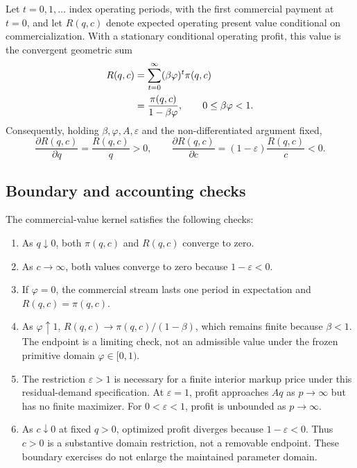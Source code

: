 Let \(t=0,1,\ldots\) index operating periods, with the first commercial
payment at \(t=0\), and let \(R(q,c)\) denote expected operating present
value conditional on commercialization. With a stationary conditional
operating profit, this value is the convergent geometric sum
\begin{align}
  R(q,c)
  &=\sum_{t=0}^{\infty}(\beta\varphi)^t\pi(q,c) \notag\\
  &=\frac{\pi(q,c)}{1-\beta\varphi},
  \qquad 0\leq\beta\varphi<1.
  \label{eq:p02-present-value}
\end{align}
Consequently, holding \(\beta,\varphi,A,\varepsilon\) and the
non-differentiated argument fixed,
\begin{equation}
  \frac{\partial R(q,c)}{\partial q}
  =\frac{R(q,c)}{q}>0,
  \qquad
  \frac{\partial R(q,c)}{\partial c}
  =(1-\varepsilon)\frac{R(q,c)}{c}<0.
  \label{eq:p02-return-derivatives}
\end{equation}

\subsection{Boundary and accounting checks}
\label{subsec:p02-boundary-accounting}

The commercial-value kernel satisfies the following checks:
\begin{enumerate}
  \item As \(q\downarrow0\), both \(\pi(q,c)\) and \(R(q,c)\) converge to
  zero.
  \item As \(c\to\infty\), both values converge to zero because
  \(1-\varepsilon<0\).
  \item If \(\varphi=0\), the commercial stream lasts one period in
  expectation and \(R(q,c)=\pi(q,c)\).
  \item As \(\varphi\uparrow1\),
  \(R(q,c)\to\pi(q,c)/(1-\beta)\), which remains finite because
  \(\beta<1\). The endpoint is a limiting check, not an admissible value
  under the frozen primitive domain \(\varphi\in[0,1)\).
  \item The restriction \(\varepsilon>1\) is necessary for a finite interior
  markup price under this residual-demand specification. At
  \(\varepsilon=1\), profit approaches \(Aq\) as \(p\to\infty\)
  but has no finite maximizer. For \(0<\varepsilon<1\), profit is
  unbounded as \(p\to\infty\).
  \item As \(c\downarrow0\) at fixed \(q>0\), optimized profit
  diverges because \(1-\varepsilon<0\). Thus \(c>0\) is a substantive
  domain restriction, not a removable endpoint. These boundary exercises
  do not enlarge the maintained parameter domain.
\end{enumerate}

